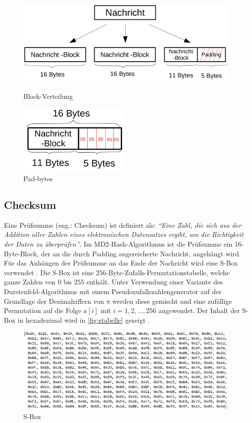 \documentclass[course=erap]{aspdoc}
\begin{document}
\begin{figure}[H]
    \centering
    \includegraphics[height=5cm]{Figures/Padding1.png}
    \caption{Block-Verteilung}
    \label{fig:blockvert}
\end{figure}

\begin{figure}[H]
	\centering
	\includegraphics[height=3.5cm]{Figures/Padding2.png}
	\caption{Pad-bytes}
	\label{fig:padbytes}
\end{figure}

\subsection{Checksum}

Eine Prüfsumme (eng.: Checksum) ist definiert als: \textit{"`Eine Zahl, die sich aus der Addition aller Zahlen eines elektronischen Datensatzes ergibt, um die Richtigkeit der Daten zu überprüfen"'}\cite{cambridge}.
Im MD2-Hash-Algorithmus ist die Prüfsumme ein 16-Byte-Block, der an die durch Padding angereicherte Nachricht, angehängt wird. Für das Anhängen der Prüfsumme an das Ende der Nachricht wird eine S-Box verwendet \cite{rfc1319}. Die S-Box ist eine 256-Byte-Zufalls-Permutationstabelle, welche ganze Zahlen von $0$ bis $255$ enthält. Unter Verwendung einer Variante des Durstenfeld-Algorithmus mit einem Pseudozufallszahlengenerator auf der Grundlage der Dezimalziffern von $\pi$ werden diese gemischt und eine zufällige Permutation auf die Folge $a[i]$ mit $i = 1, 2, ..., 256$ angewendet. Der Inhalt der S-Box in hexadezimal wird in \autoref{fig:stabelle} gezeigt \cite{rfc1319}. 

\begin{figure}[H]
    \centering
    \includegraphics[width=\textwidth]{Figures/S-table.png}
    \caption{S-Box}
    \label{fig:stabelle}
\end{figure}
\end{document}
